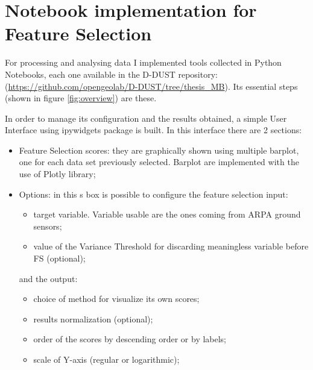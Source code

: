 \section{Notebook implementation for Feature Selection}
For processing and analysing data I implemented tools collected in Python Notebooks, each one available in the D-DUST repository:
(\url{https://github.com/opengeolab/D-DUST/tree/thesis_MB}).\newline
Its essential steps (shown in figure \ref{fig:overview}) are these.

In order to manage its configuration and the results obtained, a simple User Interface using ipywidgets package is built.
In this interface there are 2 sections:
\begin{itemize}
\item Feature Selection scores: they are graphically shown using multiple barplot, one for each data set previously selected. Barplot are implemented with the use of Plotly library; 
\item Options: in this s box is possible to configure the feature selection input:
\begin{itemize}
\item target variable. Variable usable are the ones coming from ARPA ground sensors;
\item value of the Variance Threshold for discarding meaningless variable before FS (optional);
\end{itemize}
and the output:
\begin{itemize}
\item choice of method for visualize its own scores;
\item results normalization (optional);
\item order of the scores by descending order or by labels;
\item scale of Y-axis (regular or logarithmic);
\end{itemize}
\end{itemize}

